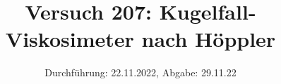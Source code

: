 

\title{Versuch 207: Kugelfall-Viskosimeter nach Höppler}
\date{Durchführung: 22.11.2022, Abgabe: 29.11.22}



\maketitle

\tableofcontents
\newpage



















\printbibliography



